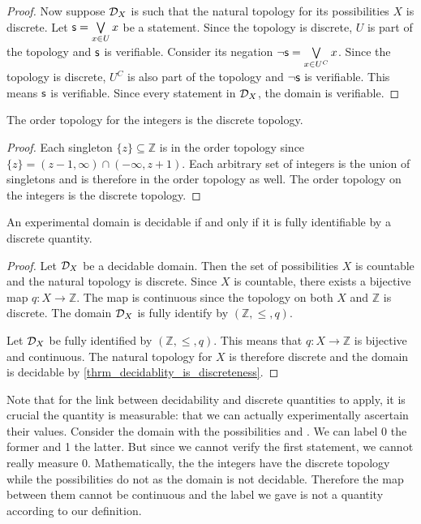 \documentclass[11pt,letterpaper,fleqn]{memoir} %
\begin{document}
\begin{mathSection}
\begin{proof}
	Now suppose $\mathcal{D}_X$ is such that the natural topology for its possibilities $X$ is discrete. Let $\mathsf{s} = \bigvee\limits_{x \in U} x$ be a statement. Since the topology is discrete, $U$ is part of the topology and $\mathsf{s}$ is verifiable. Consider its negation $\neg\mathsf{s} = \bigvee\limits_{x \in U^C} x$. Since the topology is discrete, $U^C$ is also part of the topology and $\neg\mathsf{s}$ is verifiable. This means $\mathsf{s}$ is verifiable. Since every statement in $\mathcal{D}_X$, the domain is verifiable.
\end{proof}
	
\begin{prop}
	The order topology for the integers is the discrete topology.
\end{prop}
\begin{proof}
	Each singleton $\{z\} \subseteq \mathbb{Z}$ is in the order topology since $\{z\} = (z-1, \infty) \cap (-\infty, z+1)$. Each arbitrary set of integers is the union of singletons and is therefore in the order topology as well. The order topology on the integers is the discrete topology.
\end{proof}
	
	\begin{prop}
		An experimental domain is decidable if and only if it is fully identifiable by a discrete quantity.
	\end{prop}
	
	\begin{proof}
		Let $\mathcal{D}_X$ be a decidable domain. Then the set of possibilities $X$ is countable and the natural topology is discrete. Since $X$ is countable, there exists a bijective map $q: X \to \mathbb{Z}$. The map is continuous since the topology on both $X$ and $\mathbb{Z}$ is discrete. The domain $\mathcal{D}_X$ is fully identify by $(\mathbb{Z}, \leq, q)$.
		
		Let $\mathcal{D}_X$ be fully identified by $(\mathbb{Z}, \leq, q)$. This means that $q : X \to \mathbb{Z}$ is bijective and continuous. The natural topology for $X$ is therefore discrete and the domain is decidable by \ref{thrm_decidablity_is_discreteness}.
	\end{proof}	
	
\end{mathSection}

Note that for the link between decidability and discrete quantities to apply, it is crucial the quantity is measurable: that we can actually experimentally ascertain their values. Consider the domain with the possibilities  and . We can label 0 the former and 1 the latter. But since we cannot verify the first statement, we cannot really measure 0. Mathematically, the the integers have the discrete topology while the possibilities do not as the domain is not decidable. Therefore the map between them cannot be continuous and the label we gave is not a quantity according to our definition.
\end{document}
